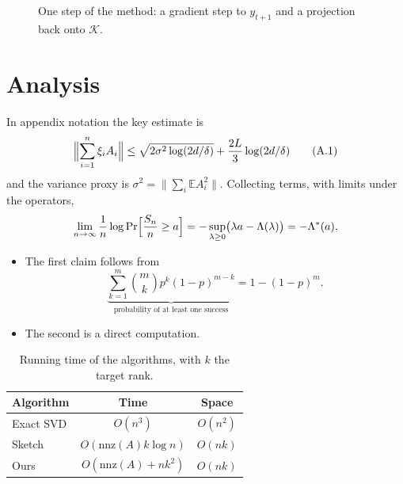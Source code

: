 \begin{figure}[t]
\centering
{}
\caption{One step of the method: a gradient step to $y_{t+1}$ and a projection back onto $\mathcal{K}$.}
\label{fig:step}
\end{figure}

\section{Analysis}
\proseE
In appendix notation the key estimate is
\begin{equation}
\Bigl\| \sum_{i=1}^{n} \xi_i A_i \Bigr\| \le \sqrt{2 \sigma^2 \log(2d/\delta)} + \frac{2L}{3}\log(2d/\delta) \tag{A.1}
\end{equation}
and the variance proxy is $\sigma^2 = \bigl\|\sum_i \mathbb{E} A_i^2\bigr\|$. Collecting terms, with limits under the operators,
\begin{equation}\label{eq:limits}
\lim_{n \to \infty} \frac{1}{n} \log \Pr\Bigl[\frac{S_n}{n} \ge a\Bigr] = -\sup_{\lambda \ge 0}\bigl(\lambda a - \Lambda(\lambda)\bigr) = -\Lambda^*(a),
\end{equation}
\proseD
\begin{itemize}
\item The first claim follows from
\[
\underbrace{\sum_{k=1}^{m} \binom{m}{k} p^k (1-p)^{m-k}}_{\text{probability of at least one success}} = 1 - (1-p)^m .
\]
\item The second is a direct computation.
\end{itemize}

\begin{table}[t]
\centering
\caption{Running time of the algorithms, with $k$ the target rank.}
\label{tab:time}
\begin{tabular}{lcc}
\toprule
Algorithm & Time & Space \\
\midrule
Exact SVD & $O(n^3)$ & $O(n^2)$ \\
Sketch & $O(\mathrm{nnz}(A) k \log n)$ & $O(nk)$ \\
Ours & $O(\mathrm{nnz}(A) + n k^2)$ & $O(nk)$ \\
\bottomrule
\end{tabular}
\end{table}

